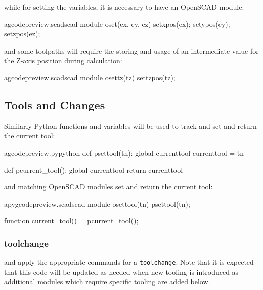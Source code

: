 \documentclass{ltxdoc}
\begin{document}
\noindent{} while for setting the variables, it is necessary to have
an OpenSCAD module:

\lstset{firstnumber=\thegcpscad}
\begin{writecode}{a}{gcodepreview.scad}{scad}
module oset(ex, ey, ez) {
    setxpos(ex);
    setypos(ey);
    setzpos(ez);
}

\end{writecode}
\addtocounter{gcpscad}{6}
 
\noindent and some toolpaths will require the storing and usage
of an intermediate value for the Z-axis position during calculation:

\lstset{firstnumber=\thegcpscad}
\begin{writecode}{a}{gcodepreview.scad}{scad}
module osettz(tz) {
    settzpos(tz);
}

\end{writecode}
\addtocounter{gcpscad}{4}

\subsection{Tools and Changes}
 
Similarly Python functions and variables will be used to track and %
set and return the current tool: 
 
\lstset{firstnumber=\thegcpy}
\begin{writecode}{a}{gcodepreview.py}{python}
def psettool(tn):
    global currenttool
    currenttool = tn

def pcurrent_tool():
    global currenttool
    return currenttool

\end{writecode}
\addtocounter{gcpy}{8}
 
\noindent and matching OpenSCAD modules set and return the current tool: 
 
\lstset{firstnumber=\thepyscad}
\begin{writecode}{a}{pygcodepreview.scad}{scad}
module osettool(tn){
    psettool(tn);
}

function current_tool() = pcurrent_tool();

\end{writecode}
\addtocounter{pyscad}{6}
 
\subsubsection{toolchange}
\noindent and apply the appropriate commands for a \texttt{toolchange}.
\label{subsubsec:toolchange}%
Note that it is expected that this code will be updated as needed when new tooling
is introduced as additional modules which require specific tooling are added below.
\end{document}
